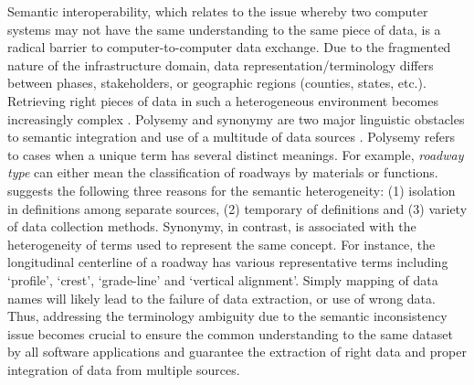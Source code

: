 \documentclass[Journal, BackFigs, DoubleSpace]{ascelike}%
\begin{document}
Semantic interoperability, which relates to the issue whereby two computer systems may not have the same understanding to the same piece of data, is a radical barrier to computer-to-computer data exchange. Due to the fragmented nature of the infrastructure domain, data representation/terminology differs between phases, stakeholders, or geographic regions (counties, states, etc.). Retrieving right pieces of data in such a heterogeneous environment becomes increasingly complex \cite{karimi2003semantic}. Polysemy and synonymy are two major linguistic obstacles to semantic integration and use of a multitude of data sources \cite{noy04}. Polysemy refers to cases when a unique term has several distinct meanings. For example, \textit{roadway type} can either mean the classification of roadways by materials or functions.  suggests the following three reasons for the semantic heterogeneity: (1) isolation in definitions among separate sources, (2) temporary of definitions and (3) variety of data collection methods. Synonymy, in contrast, is associated with the heterogeneity of terms used to represent the same concept. For instance, the longitudinal centerline of a roadway has various representative terms including `profile', `crest', `grade-line' and `vertical alignment'. Simply mapping of data names will likely lead to the failure of data extraction, or use of wrong data. Thus, addressing the terminology ambiguity due to the semantic inconsistency issue becomes crucial to ensure the common understanding to the same dataset by all software applications and guarantee the extraction of right data and proper integration of data from multiple sources. 
\par
%
\end{document}
